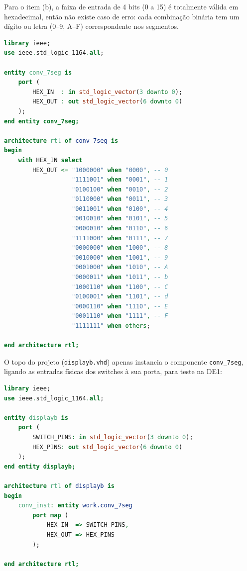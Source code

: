 \documentclass[report, 12pt]{uftreport}
\begin{document}
Para o item (b), a faixa de entrada de 4 bits (0 a 15) é totalmente válida em hexadecimal, então não existe caso de erro: cada combinação binária tem um dígito ou letra (0--9, A--F) correspondente nos segmentos.

\begin{lstlisting}[language=VHDL]
library ieee;
use ieee.std_logic_1164.all;

entity conv_7seg is
    port (
        HEX_IN  : in std_logic_vector(3 downto 0);
        HEX_OUT : out std_logic_vector(6 downto 0)
    );
end entity conv_7seg;

architecture rtl of conv_7seg is
begin
    with HEX_IN select
        HEX_OUT <= "1000000" when "0000", -- 0
                   "1111001" when "0001", -- 1
                   "0100100" when "0010", -- 2
                   "0110000" when "0011", -- 3
                   "0011001" when "0100", -- 4
                   "0010010" when "0101", -- 5
                   "0000010" when "0110", -- 6
                   "1111000" when "0111", -- 7
                   "0000000" when "1000", -- 8
                   "0010000" when "1001", -- 9
                   "0001000" when "1010", -- A
                   "0000011" when "1011", -- b
                   "1000110" when "1100", -- C
                   "0100001" when "1101", -- d
                   "0000110" when "1110", -- E
                   "0001110" when "1111", -- F
                   "1111111" when others;

end architecture rtl;
\end{lstlisting}

O topo do projeto (\texttt{displayb.vhd}) apenas instancia o componente \texttt{conv\_7seg}, ligando as entradas físicas dos switches à sua porta, para teste na DE1:

\begin{lstlisting}[language=VHDL, label={lst:displayb}]
library ieee;
use ieee.std_logic_1164.all;

entity displayb is
    port (
        SWITCH_PINS: in std_logic_vector(3 downto 0);
        HEX_PINS: out std_logic_vector(6 downto 0)
    );
end entity displayb;

architecture rtl of displayb is
begin
    conv_inst: entity work.conv_7seg
        port map (
            HEX_IN  => SWITCH_PINS,
            HEX_OUT => HEX_PINS
        );

end architecture rtl;
\end{lstlisting}

\end{document}
